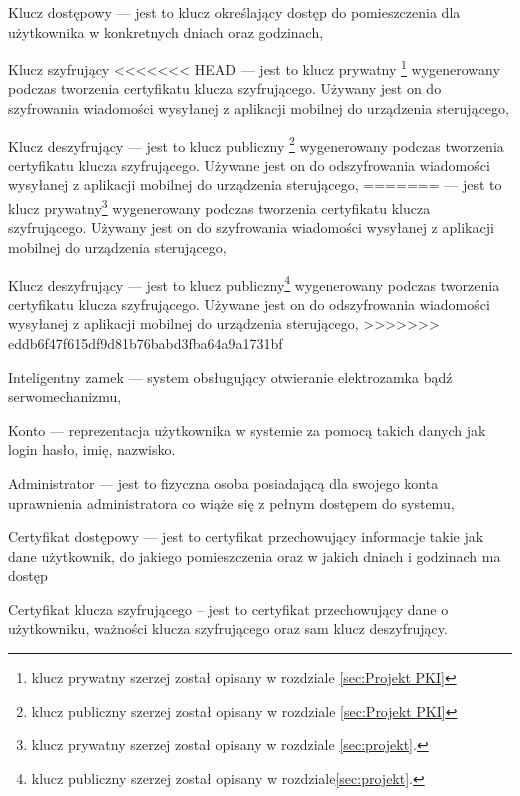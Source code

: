 \begin{itemize*}
	\item {Klucz dostępowy} --- jest to  klucz określający dostęp do pomieszczenia dla użytkownika w konkretnych dniach oraz godzinach,
	\item {Klucz szyfrujący} 
<<<<<<< HEAD
	--- jest to klucz prywatny \footnote{ klucz prywatny szerzej został opisany w rozdziale \ref{sec:Projekt PKI}} wygenerowany podczas tworzenia certyfikatu klucza szyfrującego. Używany jest on do szyfrowania wiadomości wysyłanej z aplikacji mobilnej do urządzenia sterującego,
	\item {Klucz deszyfrujący }
	--- jest to klucz publiczny \footnote{ klucz publiczny szerzej został opisany w rozdziale \ref{sec:Projekt PKI}} wygenerowany podczas tworzenia certyfikatu klucza szyfrującego. Używane jest on do odszyfrowania wiadomości wysyłanej z aplikacji mobilnej do urządzenia sterującego,
=======
	--- jest to klucz prywatny\footnote{klucz prywatny szerzej został opisany w rozdziale \ref{sec:projekt}.} wygenerowany podczas tworzenia certyfikatu klucza szyfrującego. Używany jest on do szyfrowania wiadomości wysyłanej z aplikacji mobilnej do urządzenia sterującego,
	\item {Klucz deszyfrujący }
	--- jest to klucz publiczny\footnote{klucz publiczny szerzej został opisany w rozdziale\ref{sec:projekt}.} wygenerowany podczas tworzenia certyfikatu klucza szyfrującego. Używane jest on do odszyfrowania wiadomości wysyłanej z aplikacji mobilnej do urządzenia sterującego,
>>>>>>> eddb6f47f615df9d81b76babd3fba64a9a1731bf
	\item {Inteligentny zamek}
	--- system obsługujący otwieranie elektrozamka bądź serwomechanizmu,
	\item {Konto}
	--- reprezentacja użytkownika w systemie za pomocą takich danych jak login hasło, imię, nazwisko.
	\item {Administrator}
	--- jest to fizyczna osoba posiadającą dla swojego konta uprawnienia administratora co wiąże się z pełnym dostępem do systemu,
	\item {Certyfikat dostępowy}
	--- jest to certyfikat przechowujący informacje takie jak dane użytkownik, do jakiego pomieszczenia oraz w jakich dniach i godzinach	ma dostęp
	\item {Certyfikat klucza szyfrującego}
	-- jest to certyfikat przechowujący dane o użytkowniku, ważności klucza szyfrującego oraz sam klucz deszyfrujący.
\end{itemize*}

\newpage
